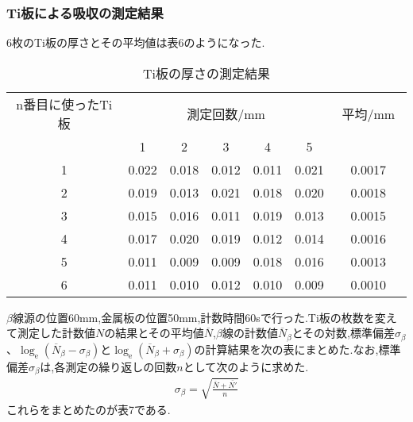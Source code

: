 \documentclass[a4j,10pt]{jarticle}
\begin{document}
    \subsubsection{Ti板による吸収の測定結果}
    6枚のTi板の厚さとその平均値は表6のようになった.
  \begin{table}[h]
    \label{Tiatusa}
    \begin{center}
    \caption{Ti板の厚さの測定結果}
      \begin{tabular}{ccccccc}
      \hline
      n番目に使ったTi板&\multicolumn{5}{c}{測定回数$/\mathrm{mm}$} & 平均$/\mathrm{mm}$　\\
        & 1 & 2 & 3 & 4 & 5 & \\ \hline
      1 & 0.022 & 0.018 & 0.012 & 0.011 & 0.021 & 0.0017\\
      2 & 0.019 & 0.013 & 0.021 & 0.018 & 0.020 & 0.0018\\
      3 & 0.015 & 0.016 & 0.011 & 0.019 & 0.013 & 0.0015\\
      4 & 0.017 & 0.020 & 0.019 & 0.012 & 0.014 & 0.0016\\
      5 & 0.011 & 0.009 & 0.009 & 0.018 & 0.016 & 0.0013\\
      6 & 0.011 & 0.010 & 0.012 & 0.010 & 0.009 & 0.0010\\
      \hline
      \end{tabular}
    \end{center}
  \end{table}
  $\beta$線源の位置60mm,金属板の位置50mm,計数時間60sで行った.Ti板の枚数を変えて測定した計数値$N$の結果とその平均値$\overline{N}$,$\beta$線の計数値$\overline{N}_{\beta}$とその対数,標準偏差$\sigma_{\beta}$、$\log_{\mathrm{e}}(\overline{N}_{\beta}-\sigma_{\beta})$と$\log_{\mathrm{e}}(\overline{N}_{\beta}+\sigma_{\beta})$の計算結果を次の表にまとめた.なお,標準偏差$\sigma_{\beta}$は,各測定の繰り返しの回数$n$として次のように求めた.
  \begin{eqnarray}
    \sigma_{\beta} = \sqrt{\frac{\overline{N}+\overline{N'}}{n}}
  \end{eqnarray}
  これらをまとめたのが表7である.
\end{document}
